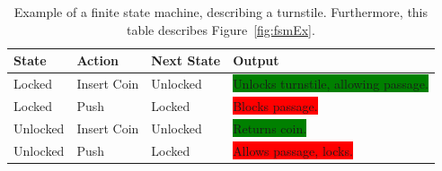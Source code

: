 \begin{table}[h]
  \centering
  \begin{tabular}{l|l|l|l}\toprule
    State   & Action    & Next State& Output \\ \midrule
    Locked    & Insert Coin & Unlocked  & \colorbox{green}{Unlocks turnstile, allowing passage.} \\
    Locked    & Push      & Locked  & \colorbox{red}{Blocks passage.} \\
    Unlocked  & Insert Coin & Unlocked  & \colorbox{green}{Returns coin.} \\
    Unlocked  & Push      & Locked  & \colorbox{red}{Allows passage, locks.} \\ \bottomrule
  \end{tabular}
  \caption{Example of a finite state machine, describing a turnstile. Furthermore, this table describes Figure~\ref{fig:fsmEx}.}
  \label{tab:fsmEx}
\end{table}